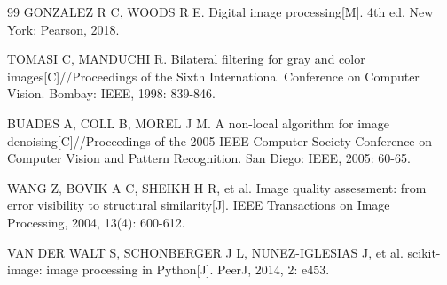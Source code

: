\documentclass[UTF8,a4paper,12pt]{ctexart}
\begin{document}
\clearpage
{}
\begin{thebibliography}{99}
GONZALEZ R C, WOODS R E. Digital image processing[M]. 4th ed. New York: Pearson, 2018.

TOMASI C, MANDUCHI R. Bilateral filtering for gray and color images[C]//Proceedings of the Sixth International Conference on Computer Vision. Bombay: IEEE, 1998: 839-846.

BUADES A, COLL B, MOREL J M. A non-local algorithm for image denoising[C]//Proceedings of the 2005 IEEE Computer Society Conference on Computer Vision and Pattern Recognition. San Diego: IEEE, 2005: 60-65.

WANG Z, BOVIK A C, SHEIKH H R, et al. Image quality assessment: from error visibility to structural similarity[J]. IEEE Transactions on Image Processing, 2004, 13(4): 600-612.

VAN DER WALT S, SCHONBERGER J L, NUNEZ-IGLESIAS J, et al. scikit-image: image processing in Python[J]. PeerJ, 2014, 2: e453.
\end{thebibliography}
\end{document}
